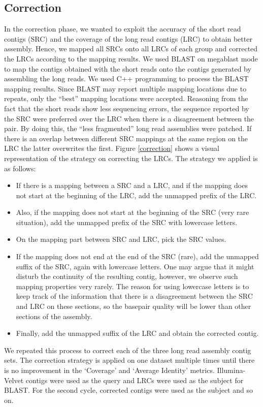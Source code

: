 \documentclass{llncs}
\begin{document}
\subsection{Correction} 
In the correction phase, we wanted to exploit the accuracy of the short read contigs (SRC) and the coverage of the long read contigs (LRC) to obtain better assembly. 
Hence, we mapped all SRCs onto all LRCs of each group and corrected the LRCs according to the mapping results.
We used BLAST \cite{blast} on megablast mode to map the contigs obtained with the short reads onto the contigs generated by assembling the long reads. 
We used C++ programming to process the BLAST mapping results. 
Since BLAST may report multiple mapping locations due to repeats, only the ``best'' mapping locations were accepted. 
Reasoning from the fact that the short reads show less sequencing errors, the sequence reported by the SRC were preferred over the LRC when there is a disagreement between the pair. 
By doing this, the ``less fragmented'' long read assemblies were patched. 
If there is an overlap between different SRC mappings at the same region on the LRC the latter overwrites the first. 
Figure \ref{correction} shows a visual representation of the strategy on correcting the LRCs. 
The strategy we applied is as follows: 
\begin{itemize}
\item If there is a mapping between a SRC and a LRC, and if the mapping does not start at the beginning of the LRC, add the unmapped prefix of the LRC. 
\item Also, if the mapping does not start at the beginning of the SRC (very rare situation), add the unmapped prefix of the SRC with lowercase letters. 
\item On the mapping part between SRC and LRC, pick the SRC values. 
\item If the mapping does not end at the end of the SRC (rare), add the unmapped suffix of the SRC, again with lowercase letters. One may argue that it might disturb the continuity of the resulting contig, however, we observe such mapping properties very rarely. The reason for using lowercase letters is to keep track of the information that there is a disagreement between the SRC and LRC on these sections, so the basepair quality will be lower than other sections of the assembly. 
\item Finally, add the unmapped suffix of the LRC and obtain the corrected contig.
\end{itemize}
We repeated this process to correct each of the three long read assembly contig sets. The correction strategy is applied on one dataset multiple times until there is no improvement in the `Coverage' and `Average Identity' metrics. Illumina-Velvet contigs were used as the query and LRCs were used as the subject for BLAST. For the second cycle, corrected contigs were used as the subject and so on.
\end{document}
